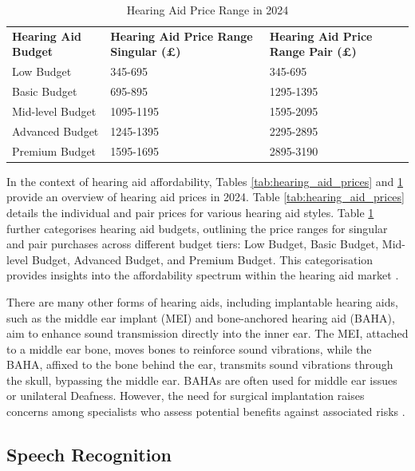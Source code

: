 \documentclass{l4proj}
\begin{document}
\begin{table}[htbp]
    \caption{Hearing Aid Price Range in 2024}\label{tab:hearing_aid_price_range}
    \begin{tabular}{@{}lll@{}}
    \textbf{Hearing Aid Budget} & \textbf{Hearing Aid Price Range Singular (£)} & \textbf{Hearing Aid Price Range Pair (£)} \\ 
    Low Budget & 345-695 & 345-695 \\ 
    Basic Budget & 695-895 & 1295-1395 \\ 
    Mid-level Budget & 1095-1195 & 1595-2095 \\ 
    Advanced Budget & 1245-1395 & 2295-2895 \\ 
    Premium Budget & 1595-1695 & 2895-3190 \\
\end{tabular}
\end{table}

In the context of hearing aid affordability, Tables \ref{tab:hearing_aid_prices} and \ref{tab:hearing_aid_price_range} provide an overview of hearing aid prices in 2024. Table \ref{tab:hearing_aid_prices} details the individual and pair prices for various hearing aid styles. Table \ref{tab:hearing_aid_price_range} further categorises hearing aid budgets, outlining the price ranges for singular and pair purchases across different budget tiers: Low Budget, Basic Budget, Mid-level Budget, Advanced Budget, and Premium Budget. This categorisation provides insights into the affordability spectrum within the hearing aid market \citep{Harrison_2024}.

There are many other forms of hearing aids, including implantable hearing aids, such as the middle ear implant (MEI) and bone-anchored hearing aid (BAHA), aim to enhance sound transmission directly into the inner ear. The MEI, attached to a middle ear bone, moves bones to reinforce sound vibrations, while the BAHA, affixed to the bone behind the ear, transmits sound vibrations through the skull, bypassing the middle ear. BAHAs are often used for middle ear issues or unilateral Deafness. However, the need for surgical implantation raises concerns among specialists who assess potential benefits against associated risks \citep{Disorders_2022}.

\subsection{Speech Recognition}
\label{sec:speech-recog}
\end{document}
